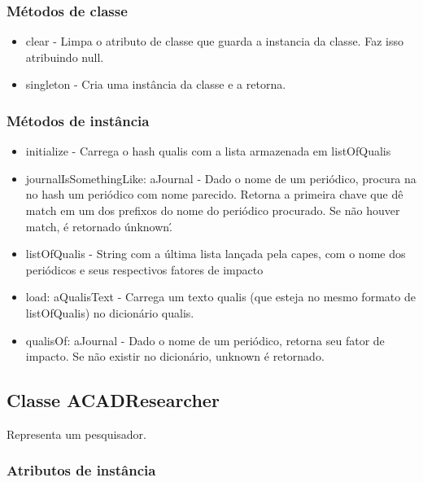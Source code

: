 \subsubsection{Métodos de classe}

\begin{itemize}

  \item clear - Limpa o atributo de classe que guarda a instancia da classe. Faz isso atribuindo null.
  \item singleton - Cria uma instância da classe e a retorna.

\end{itemize}

\subsubsection{Métodos de instância}

\begin{itemize}

  \item initialize - Carrega o hash qualis com a lista armazenada em listOfQualis

  \item journalIsSomethingLike: aJournal - Dado o nome de um periódico, procura na no hash um periódico com nome parecido. Retorna a primeira chave que dê match em um dos prefixos do nome do periódico procurado. Se não houver match, é retornado \'unknown\'.

  \item listOfQualis - String com a última lista lançada pela capes, com o nome dos periódicos e seus  respectivos fatores de impacto
  
  \item load: aQualisText - Carrega um texto qualis (que esteja no mesmo formato de listOfQualis) no dicionário  qualis.
  
  \item qualisOf: aJournal - Dado o nome de um periódico, retorna seu fator de impacto. Se não existir no dicionário, unknown é retornado.

\end{itemize}

\subsection{Classe ACADResearcher}

Representa um pesquisador.

\subsubsection{Atributos de instância}

